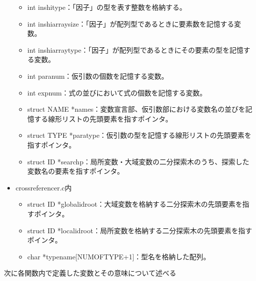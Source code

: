 \documentclass{jarticle}
\begin{document}
\begin{itemize}
\begin{itemize}
    \item int inshitype：「因子」の型を表す整数を格納する。
    \item int inshiarraysize：「因子」が配列型であるときに要素数を記憶する変数。
    \item int inshiarraytype：「因子」が配列型であるときにその要素の型を記憶する変数。
    \item int paranum：仮引数の個数を記憶する変数。
    \item int expnum：式の並びにおいて式の個数を記憶する変数。
    \item struct NAME *names：変数宣言部、仮引数部における変数名の並びを記憶する線形リストの先頭要素を指すポインタ。
    \item struct TYPE *paratype：仮引数の型を記憶する線形リストの先頭要素を指すポインタ。
    \item struct ID *searchp：局所変数・大域変数の二分探索木のうち、探索した変数名の要素を指すポインタ。
  \end{itemize}
  \item crossreferencer.c内
  \begin{itemize}
    \item struct ID *globalidroot：大域変数を格納する二分探索木の先頭要素を指すポインタ。
    \item struct ID *localidroot：局所変数を格納する二分探索木の先頭要素を指すポインタ。
    \item char *typename[NUMOFTYPE+1]：型名を格納した配列。
  \end{itemize}
\end{itemize}

次に各関数内で定義した変数とその意味について述べる
\end{document}
